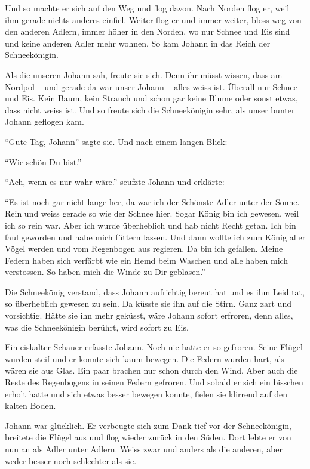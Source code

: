 Und so machte er sich auf den Weg und flog davon. Nach Norden flog er, weil ihm gerade nichts anderes einfiel. Weiter flog er und immer weiter, bloss weg von den anderen Adlern, immer höher in den Norden, wo nur Schnee und Eis sind und keine anderen Adler mehr wohnen. So kam Johann in das Reich der Schneekönigin.

Als die unseren Johann sah, freute sie sich. Denn ihr müsst wissen, dass am Nordpol -- und gerade da war unser Johann -- alles weiss ist. Überall nur Schnee und Eis. Kein Baum, kein Strauch und schon gar keine Blume oder sonst etwas, dass nicht weiss ist. Und so freute sich die Schneekönigin sehr, als unser bunter Johann geflogen kam. 

\enquote{Gute Tag, Johann} sagte sie. Und nach einem langen Blick: 

\enquote{Wie schön Du bist.} 

\enquote{Ach, wenn es nur wahr wäre.} seufzte Johann und erklärte: 

\enquote{Es ist noch gar nicht lange her, da war ich der Schönste Adler unter der Sonne. Rein und weiss gerade so wie der Schnee hier. Sogar König bin ich gewesen, weil ich so rein war. Aber ich wurde überheblich und hab nicht Recht getan. Ich bin faul geworden und habe mich füttern lassen. Und dann wollte ich zum König aller Vögel werden und vom Regenbogen aus regieren. Da bin ich gefallen. Meine Federn haben sich verfärbt wie ein Hemd beim Waschen und alle haben mich verstossen. So haben mich die Winde zu Dir geblasen.}

Die Schneekönig verstand, dass Johann aufrichtig bereut hat und es ihm Leid tat, so überheblich gewesen zu sein. Da küsste sie ihn auf die Stirn. Ganz zart und vorsichtig. Hätte sie ihn mehr geküsst, wäre Johann sofort erfroren, denn alles, was die Schneekönigin berührt, wird sofort zu Eis. 

Ein eiskalter Schauer erfasste Johann. Noch nie hatte er so gefroren. Seine Flügel wurden steif und er konnte sich kaum bewegen. Die Federn wurden hart, als wären sie aus Glas. Ein paar brachen nur schon durch den Wind. Aber auch die Reste des Regenbogens in seinen Federn gefroren. Und sobald er sich ein bisschen erholt hatte und sich etwas besser bewegen konnte, fielen sie klirrend auf den kalten Boden.

Johann war glücklich. Er verbeugte sich zum Dank tief vor der Schneekönigin, breitete die Flügel aus und flog wieder zurück in den Süden. Dort lebte er von nun an als Adler unter Adlern. Weiss zwar und anders als die anderen, aber weder besser noch schlechter als sie. \hfill {\color{red}\decofourleft}
